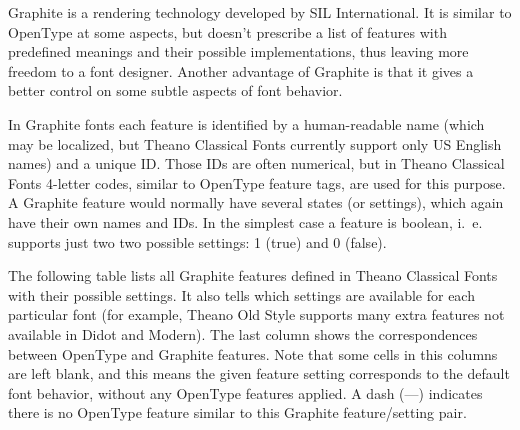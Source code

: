 \documentclass[12pt,a4paper,openany]{article}
\begin{document}
Graphite is a rendering technology developed by SIL International. It is
similar to OpenType at some aspects, but doesn't prescribe a list of features
with predefined meanings and their possible implementations, thus leaving more
freedom to a font designer. Another advantage of Graphite is that it gives
a better control on some subtle aspects of font behavior.

In Graphite fonts each feature is identified by a human-readable name
(which may be localized, but Theano Classical Fonts currently support only US
English names) and a unique ID. Those IDs are often numerical, but in
Theano Classical Fonts 4-letter codes, similar to OpenType feature tags, are used
for this purpose. A Graphite feature would normally have several states (or
settings), which again have their own names and IDs. In the simplest case
a feature is boolean, i.~e. supports just two two possible settings: 1
(true) and 0 (false).

The following table lists all Graphite features defined in Theano Classical
Fonts with their possible settings. It also tells which settings are available
for each particular font (for example, Theano Old Style supports many extra
features not available in Didot and Modern). The last column shows the
correspondences between OpenType and Graphite features. Note that some cells
in this columns are left blank, and this means the given feature setting
corresponds to the default font behavior, without any OpenType features applied.
A dash (---) indicates there is no OpenType feature similar to this Graphite
feature/setting pair.
\end{document}
